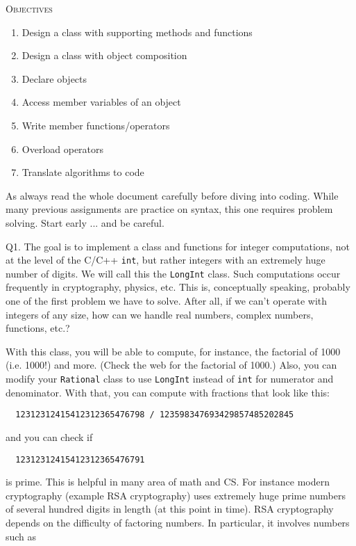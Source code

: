 


\renewcommand\TITLE{Assignment 11}


\topmatter

\textsc{Objectives}     
\begin{enumerate}[nosep]
        \item Design a class with supporting methods and functions
        \item Design a class with object composition
        \item Declare objects
        \item Access member variables of an object
        \item Write member functions/operators
        \item Overload operators
        \item Translate algorithms to code
    \end{enumerate}

As always read the whole document carefully before diving into coding.
While many previous assignments are practice on syntax, this one
requires problem solving.
Start early ... and be careful.

\newpage
Q1.
The goal is to implement a class and functions for integer computations, not at
the level of the C/C++ \verb!int!, but rather integers with an extremely huge
number of digits. We will call this the \verb!LongInt! class.  Such
computations occur frequently in cryptography, physics, etc. This is,
conceptually speaking, probably one of the first problem we have to solve.
After all, if we can't operate with integers of any size, how can we handle
real numbers, complex numbers, functions, etc.?

With this class, you will be able to compute, for instance, the factorial of
1000 (i.e. 1000!) and more.  (Check the web for the factorial of 1000.) Also,
you can modify your \verb!Rational! class to use \verb!LongInt! instead of
\verb!int!  for numerator and denominator. With that, you can compute with
fractions that look like this:

\verb!  12312312415412312365476798 / 123598347693429857485202845!

and you can check if

\verb!  12312312415412312365476791!

is prime.  This is helpful in many area of math and CS. For instance modern
cryptography (example RSA cryptography) uses extremely huge prime numbers of
several hundred digits in length (at this point in time). RSA cryptography
depends on the difficulty of factoring numbers. In particular, it involves
numbers such as

